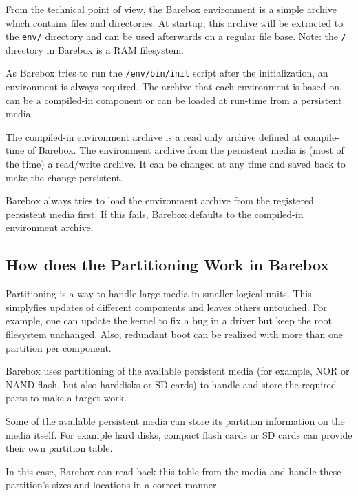 From the technical point of view, the Barebox environment is a simple
archive which contains files and directories. At startup, this archive will
be extracted to the \texttt{env/} directory and can be used afterwards on a
regular file base. Note: the \texttt{/} directory in Barebox is a RAM
filesystem.

As Barebox tries to run the \texttt{/env/bin/init} script after the
initialization, an environment is always required. The archive that each
environment is based on, can be a compiled-in component or can be loaded at
run-time from a persistent media.

The compiled-in environment archive is a read only archive defined at
compile-time of Barebox. The environment archive from the persistent
media is (most of the time) a read/write archive. It can be changed at any
time and saved back to make the change persistent.

Barebox always tries to load the environment archive from the registered
persistent media first. If this fails, Barebox defaults to the compiled-in
environment archive.


\subsection{How does the Partitioning Work in Barebox}	\label{sec:bbpartitioning}

Partitioning is a way to handle large media in smaller logical units. This
simplyfies updates of different components and leaves others untouched. For
example, one can update the kernel to fix a bug in a driver but keep the
root filesystem unchanged. Also, redundant boot can be realized with more than
one partition per component.

%
%

Barebox uses partitioning of the available persistent media (for example, NOR
or NAND flash, but also harddisks or SD cards) to handle and store the
required parts to make a target work.

Some of the available persistent media can store its partition information on
the media itself. For example hard disks, compact flash cards or SD cards can
provide their own partition table.

In this case, Barebox can read back this table from the media and handle
these partition's sizes and locations in a correct manner.

